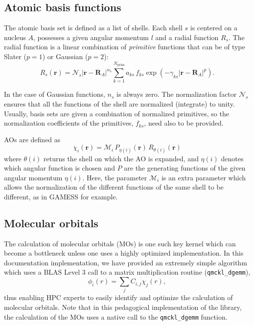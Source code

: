 \subsection{Atomic basis functions}

The atomic basis set is defined as a list of shells. Each shell $s$ is
centered on a nucleus $A$, possesses a given angular momentum $l$ and a
radial function $R_s$. The radial function is a linear combination of
\emph{primitive} functions that can be of type Slater ($p=1$)  or
Gaussian ($p=2$):
\[
  R_s(\mathbf{r}) = \mathcal{N}_s |\mathbf{r}-\mathbf{R}_A|^{n_s}
  \sum_{k=1}^{N_{\text{prim}}} a_{ks}\, f_{ks}
 \exp \left( - \gamma_{ks} | \mathbf{r}-\mathbf{R}_A | ^p \right).
\]

In the case of Gaussian functions, $n_s$ is always zero.  The
normalization factor $\mathcal{N}_s$ ensures that all the functions of
the shell are normalized (integrate) to unity. Usually, basis sets are
given a combination of normalized primitives, so the normalization
coefficients of the primitives, $f_{ks}$, need also to be provided.

\acp{AO} are defined as
\[
\chi_i (\mathbf{r}) = \mathcal{M}_i\, P_{\eta(i)}(\mathbf{r})\, R_{\theta(i)} (\mathbf{r})
\] 
where $\theta(i)$ returns the shell on which the \ac{AO} is expanded, and
$\eta(i)$ denotes which angular function is chosen and $P$ are the
generating functions of the given angular momentum $\eta(i)$.  Here,
the parameter $\mathcal{M}_i$ is an extra parameter which allows the
normalization of the different functions of the same shell to be
different, as in GAMESS for example.


\subsection{Molecular orbitals}

The calculation of molecular orbitals (MOs) is one such key kernel which can
become a bottleneck unless one uses a highly optimized implementation.
In this documentation implementation, we have provided an extremely simple
algorithm which uses a \ac{BLAS} Level 3 call to a matrix multiplication
routine (\texttt{qmckl_dgemm}),
\[
  \phi_i(r) = \sum_{j}C_{i,j}\chi_j(r),
    \label{eq:mos}
\]
thus enabling \ac{HPC} experts to easily identify and optimize the calculation
of molecular orbitals. Note that in this pedagogical implementation of the
library, the calculation of the \acp{MO} uses a native call to the
\texttt{qmckl_dgemm} function.

